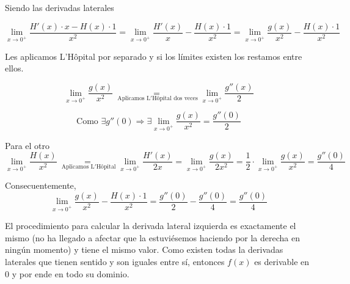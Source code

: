 \documentclass[12pt]{article}
\begin{document}
\begin{ejercicio}[2 puntos]
		Siendo las derivadas laterales
		
		$$ \lim_{x\rightarrow0^+} \frac{H'(x)\cdot x - H(x)\cdot 1}{x^2} = \lim_{x\rightarrow0^+} \frac{H'(x)}{x} - \frac{H(x)\cdot 1}{x^2} = 
		\lim_{x\rightarrow0^+} \frac{g(x)}{x^2} - \frac{H(x)\cdot 1}{x^2}$$
		
		Les aplicamos L'Hôpital por separado y si los límites existen los restamos entre ellos.
		
		$$\lim_{x\rightarrow0^+} \frac{g(x)}{x^2} \underset{\text{ Aplicamos L$'$Hôpital dos veces}}{=} \lim_{x\rightarrow0^+} \frac{g''(x)}{2}$$
		
		$$\text{Como } \exists g''(0) \Rightarrow \exists \lim_{x\rightarrow0^+} \frac{g(x)}{x^2}= \frac{g''(0)}{2}$$
		
		Para el otro
		$$\lim_{x\rightarrow0^+} \frac{H(x)}{x^2} \underset{\text{ Aplicamos L$'$Hôpital}}{=} \lim_{x\rightarrow0^+} \frac{H'(x)}{2x} = \lim_{x\rightarrow0^+} \frac{g(x)}{2x^2} = \frac{1}{2}\cdot \lim_{x\rightarrow0^+} \frac{g(x)}{x^2} = \frac{g''(0)}{4}$$
		
		Consecuentemente, 
		$$\lim_{x\rightarrow0^+} \frac{g(x)}{x^2} - \frac{H(x)\cdot 1}{x^2} = \frac{g''(0)}{2}-\frac{g''(0)}{4}=\frac{g''(0)}{4}$$
		
		El procedimiento para calcular la derivada lateral izquierda es exactamente el mismo (no ha llegado a afectar que la estuviésemos haciendo por la derecha en ningún momento) y tiene el mismo valor. Como existen todas la derivadas laterales que tienen sentido y son iguales entre sí, entonces $f(x)$ es derivable en 0 y por ende en todo su dominio.
		
	\end{ejercicio}
	
\end{document}
